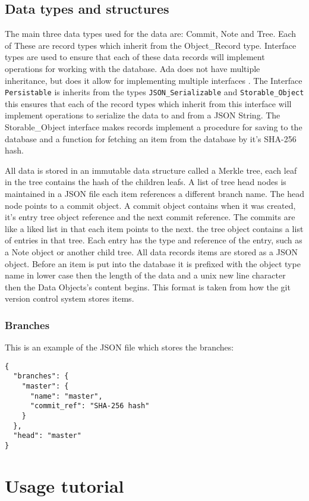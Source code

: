 \documentclass[12pt,a4paper]{article}
\newcommand{\codetext}[1]{\colorbox{light-gray}{\texttt{#1}}}
\begin{document}
\subsection{Data types and structures}
The main three data types used for the data are: Commit, Note and Tree. Each of These are record types which inherit from the Object\_Record type. Interface types are used to ensure that each of these data records will implement operations for working with the database. Ada does not have multiple inheritance, but does it allow for implementing multiple interfaces  \cite{Ada-Interface-Types}. The Interface \codetext{Persistable} is inherits from the types \codetext{JSON\_Serializable} and \codetext{Storable\_Object} this ensures that each of the record types which inherit from this interface will implement operations to serialize the data to and from a JSON \cite{rfc7159} String. The Storable\_Object interface makes records implement a procedure for saving to the database and a function for fetching an item from the database by it's SHA-256 hash.  \\

\par
All data is stored in an immutable data structure called a Merkle tree, each leaf in the tree contains the hash of the children leafs. A list of tree head nodes is maintained in a JSON file each item references a different branch name. The head node points to a commit object. A commit object contains when it was created, it's entry tree object reference and the next commit reference. The commits are like a liked list in that each item points to the next. the tree object contains a list of entries in that tree. Each entry has the type and reference of the entry, such as a Note object or another child tree. All data records items are stored as a JSON object. Before an item is put into the database it is prefixed with the object type name in lower case then the length of the data and a unix new line character then the Data Objects's content begins. This format is taken from how the git version control system stores items.

\subsubsection{Branches}

This is an example of the JSON file which stores the branches:

\begin{verbatim}
{
  "branches": {
    "master": {
      "name": "master",
      "commit_ref": "SHA-256 hash"
    }
  },
  "head": "master"
}
\end{verbatim}



\section{Usage tutorial}



\end{document}
